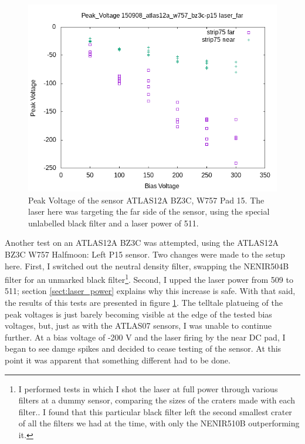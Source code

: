 \documentclass{report}
\begin{document}
            
            \begin{figure}[h] 
                \includegraphics[height=.4\textheight]{Peak_Voltage__150908_atlas12a_w757_bz3c-p15__laser_far}
                \centering
                \caption{ Peak Voltage of the sensor ATLAS12A BZ3C, W757 Pad 15. The laser here was targeting the far side of the sensor, using the special unlabelled black filter and a laser power of 511. }
                \label{fig:Peak_Voltage__150908_atlas12a_w757_bz3c-p15__laser_far}
            \end{figure}

            Another test on an ATLAS12A BZ3C was attempted, using the ATLAS12A BZ3C W757 Halfmoon: Left P15 sensor. Two changes were made to the setup here. First, I switched out the neutral density filter, swapping the NENIR504B filter for an unmarked black filter\footnote{I performed tests in which I shot the laser at full power through various filters at a dummy sensor, comparing the sizes of the craters made with each filter.. I found that this particular black filter left the second smallest crater of all the filters we had at the time, with only the NENIR510B outperforming it.}. Second, I upped the laser power from 509 to 511; section \ref{sect:laser_power} explains why this increase is safe. With that said, the results of this tests are presented in figure \ref{fig:Peak_Voltage__150908_atlas12a_w757_bz3c-p15__laser_far}. The telltale platueing of the peak voltages is just barely becoming visible at the edge of the tested bias voltages, but, just as with the ATLAS07 sensors, I was unable to continue further. At a bias voltage of -200 V and the laser firing by the near DC pad, I began to see damge spikes and decided to cease testing of the sensor. At this point it was apparent that something different had to be done.
            
\end{document}
